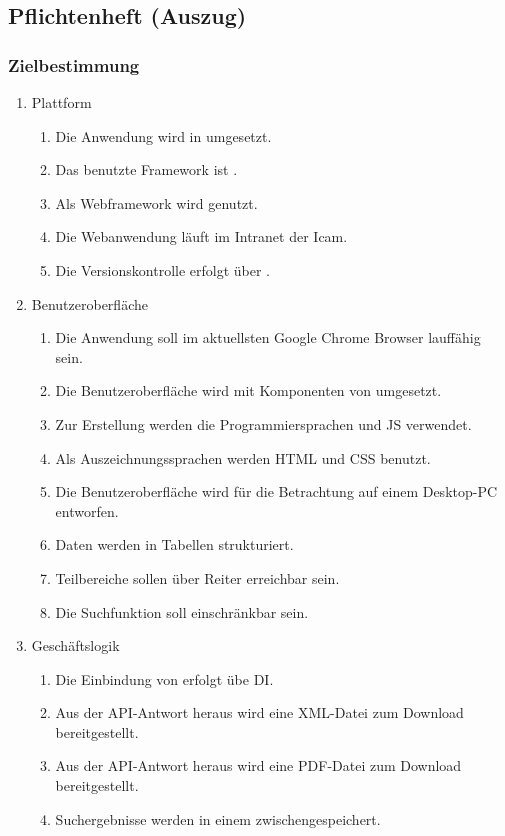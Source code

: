 \subsection{Pflichtenheft (Auszug)}
\label{app:Pflichtenheft}

\subsubsection*{Zielbestimmung}
\begin{enumerate}
    \item Plattform
        \begin{enumerate}
            \item Die Anwendung wird in  umgesetzt.
            \item Das benutzte Framework ist .
            \item Als Webframework wird  genutzt.
            \item Die Webanwendung läuft im Intranet der \acs{Icam}.
            \item Die Versionskontrolle erfolgt über .
        \end{enumerate}
    \item Benutzeroberfläche
        \begin{enumerate}
            \item Die Anwendung soll im aktuellsten Google Chrome Browser lauffähig sein.
            \item Die Benutzeroberfläche wird mit Komponenten von  umgesetzt.
            \item Zur Erstellung werden die Programmiersprachen  und \acs{JS} verwendet.
            \item Als Auszeichnungssprachen werden \acs{HTML} und \acs{CSS} benutzt.
            \item Die Benutzeroberfläche wird für die Betrachtung auf einem Desktop-PC entworfen.
            \item Daten werden in Tabellen strukturiert.
            \item Teilbereiche sollen über Reiter erreichbar sein.
            \item Die Suchfunktion soll einschränkbar sein.
        \end{enumerate}
    \item Geschäftslogik
        \begin{enumerate}
            \item Die Einbindung von  erfolgt übe \acs{DI}.
            \item Aus der \acs{API}-Antwort heraus wird eine \acs{XML}-Datei zum Download bereitgestellt.
            \item Aus der \acs{API}-Antwort heraus wird eine \acs{PDF}-Datei zum Download bereitgestellt.
            \item Suchergebnisse werden in einem  zwischengespeichert.
        \end{enumerate}
\end{enumerate}